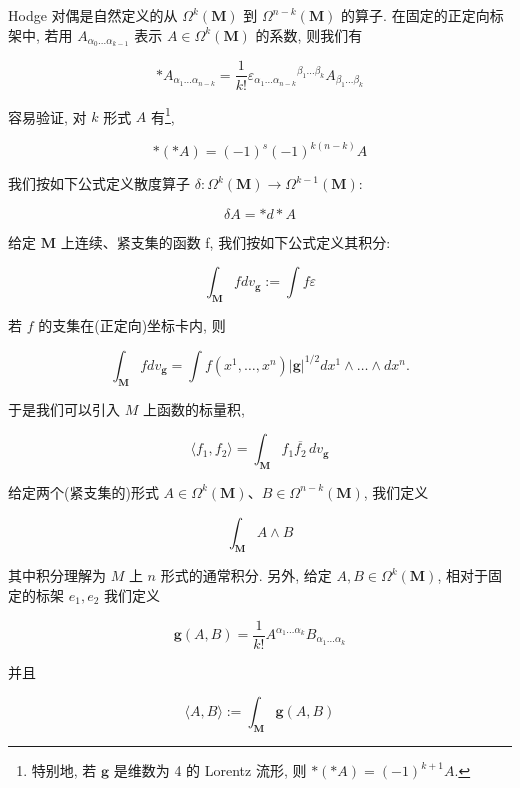Hodge 对偶是自然定义的从 $\Omega^{k}(\mathbf{M})$ 到 $\Omega^{n-k}(\mathbf{M})$ 的算子. 在固定的正定向标架中, 若用 $A_{\alpha_{0}\ldots\alpha_{k-1}}$ 表示 $A \in \Omega^{k}(\mathbf{M})$ 的系数, 则我们有

\[
\ast A_{\alpha_{1}\dots\alpha_{n-k}} = \frac{1}{k!}\varepsilon_{\alpha_{1}\dots\alpha_{n-k}}{}^{\beta_{1}\dots\beta_{k}}A_{\beta_{1}\dots\beta_{k}}
\]

容易验证, 对 $k$ 形式 $A$ 有\footnote{特别地, 若 $\mathbf{g}$ 是维数为 4 的 Lorentz 流形, 则 $*(*A) = (-1)^{k+1}A$.},

\begin{equation}
*(*A) = (-1)^{s}(-1)^{k(n-k)}A\label{eq:cA-422}
\end{equation}

我们按如下公式定义散度算子 $\delta : \Omega^{k}(\mathbf{M}) \to \Omega^{k-1}(\mathbf{M})$:

\begin{equation}
\delta A = *d*A\label{eq:cA-423}
\end{equation}

给定 $\mathbf{M}$ 上连续、紧支集的函数 f, 我们按如下公式定义其积分:

\[
\int_{\mathbf{M}}fdv_{\mathbf{g}} := \int f\varepsilon
\]

若 $f$ 的支集在(正定向)坐标卡内, 则

\[
\int_{\mathbf{M}}fdv_{\mathbf{g}} = \int f(x^{1}, \ldots, x^{n})|\mathbf{g}|^{1/2}dx^{1} \wedge \ldots \wedge dx^{n}.
\]

于是我们可以引入 $M$ 上函数的标量积,

\begin{equation}
\langle f_{1}, f_{2}\rangle = \int_{\mathbf{M}}f_{1}\overline{f_{2}}\, dv_{\mathbf{g}}\label{eq:cA-424}
\end{equation}

给定两个(紧支集的)形式 $A \in \Omega^k(\mathbf{M})$、$B \in \Omega^{n-k}(\mathbf{M})$, 我们定义

\[
\int_{\mathbf{M}}A \wedge B
\]

其中积分理解为 $M$ 上 $n$ 形式的通常积分. 另外, 给定 $A, B \in \Omega^{k}(\mathbf{M})$, 相对于固定的标架 $e_{1}, e_{2}$ 我们定义

\[
\mathbf{g}(A, B) = \frac{1}{k!}A^{\alpha_{1}\dots\alpha_{k}}B_{\alpha_{1}\dots\alpha_{k}}
\]

并且

\begin{equation}
\langle A, B\rangle := \int_{\mathbf{M}}\mathbf{g}(A, B)\label{eq:cA-425}
\end{equation}

